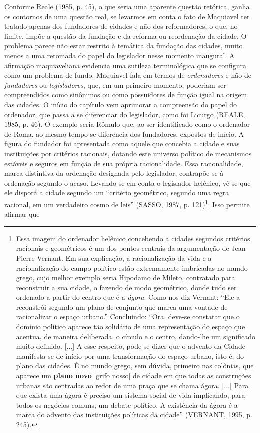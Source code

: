 Conforme Reale (1985, p. 45), o que seria uma aparente questão retórica,
ganha os contornos de uma questão real, se levarmos em conta o fato de
Maquiavel ter tratado apenas dos fundadores de cidades e não dos
reformadores, o que, no limite, impõe a questão da fundação e da reforma
ou reordenação da cidade. O problema parece não estar restrito à
temática da fundação das cidades, muito menos a uma retomada do papel do
legislador nesse momento inaugural. A afirmação maquiaveliana evidencia
uma sutileza terminológica que se configura como um problema de fundo.
Maquiavel fala em termos de \emph{ordenadores} e não de
\emph{fundadores} ou \emph{legisladores}, que, em um primeiro momento,
poderiam ser compreendidos como sinônimos ou como possuidores de função
igual na origem das cidades. O início do capítulo vem aprimorar a
compreensão do papel do ordenador, que passa a se diferenciar do
legislador, como foi Licurgo (REALE, 1985, p. 46). O exemplo seria
Rômulo que, ao ser identificado como o ordenador de Roma, ao mesmo tempo
se diferencia dos fundadores, expostos de início. A figura do fundador
foi apresentada como aquele que concebia a cidade e suas instituições
por critérios racionais, dotando este universo político de mecanismos
estáveis e seguros em função de sua própria racionalidade. Essa
racionalidade, marca distintiva da ordenação designada pelo legislador,
contrapõe-se à ordenação segundo o acaso. Levando-se em conta o
legislador helênico, vê-se que ele disporá a cidade segundo um
``critério geométrico, segundo uma regra racional, em um verdadeiro
cosmo de leis'' (SASSO, 1987, p. 121)\footnote{Essa imagem do ordenador
  helênico concebendo a cidades segundos critérios racionais e
  geométricos é um dos pontos centrais da argumentação de Jean-Pierre
  Vernant. Em sua explicação, a racionalização da vida e a
  racionalização do campo político estão extremamente imbricadas no
  mundo grego, cujo melhor exemplo seria Hipodamo de Mileto, contratado
  para reconstruir a sua cidade, o fazendo de modo geométrico, donde
  tudo ser ordenado a partir do centro que é a \emph{ágora}. Como nos
  diz Vernant: ``Ele a reconstrói segundo um plano de conjunto que marca
  uma vontade de racionalizar o espaço urbano.'' Concluindo: ``Ora,
  deve-se constatar que o domínio político aparece tão solidário de uma
  representação do espaço que acentua, de maneira deliberada, o círculo
  e o centro, dando-lhe um significado muito definido. {[}...{]} A esse
  respeito, pode-se dizer que o advento da Cidade manifesta-se de início
  por uma transformação do espaço urbano, isto é, do plano das cidades.
  É no mundo grego, sem dúvida, primeiro nas colônias, que aparece um
  \textbf{plano novo} {[}grifo nosso{]} de cidade em que todas as
  construções urbanas são centradas ao redor de uma praça que se chama
  ágora. {[}...{]} Para que exista uma ágora é preciso um sistema social
  de vida implicando, para todos os negócios comuns, um debate político.
  A existência da ágora é a marca do advento das instituições políticas
  da cidade'' (VERNANT, 1995, p. 245).}. Isso permite afirmar que
